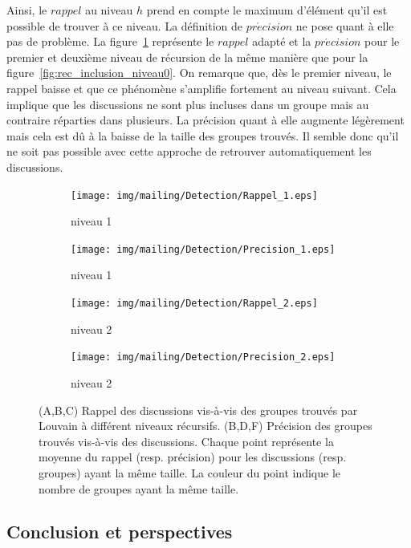 Ainsi, le $rappel$ au niveau $h$ prend en compte le maximum d'élément qu'il est possible de trouver à ce niveau.
La définition de $pr\acute{e}cision$ ne pose quant à  elle pas de problème.
La figure~\ref{fig:rec_inclusion} représente le $rappel$ adapté et la $pr\acute{e}cision$ pour le premier et deuxième niveau de récursion de la même manière que pour la figure~\ref{fig:rec_inclusion_niveau0}.
On remarque que, dès le premier niveau, le rappel baisse et que ce phénomène s'amplifie fortement au niveau suivant.
Cela implique que les discussions ne sont plus incluses dans un groupe mais au contraire réparties dans plusieurs.
La précision quant à elle augmente légèrement mais cela est dû à la baisse de la taille des groupes trouvés.
Il semble donc qu'il ne soit pas possible avec cette approche de retrouver automatiquement les discussions.


\begin{figure}
\centering
	\hfill
	\begin{subfigure}{0.4\textwidth}
		\texttt{[image: img/mailing/Detection/Rappel\_1.eps]}
		\caption{niveau 1}		
	\end{subfigure}
	\begin{subfigure}{0.4\textwidth}
		\texttt{[image: img/mailing/Detection/Precision\_1.eps]}
		\caption{niveau 1}		
	\end{subfigure}\hfill
	
	\hfill
	\begin{subfigure}{0.4\textwidth}
		\texttt{[image: img/mailing/Detection/Rappel\_2.eps]}
		\caption{niveau 2}		
	\end{subfigure}
	\begin{subfigure}{0.4\textwidth}
		\texttt{[image: img/mailing/Detection/Precision\_2.eps]}
		\caption{niveau 2}		
	\end{subfigure}\hfill

\caption{(A,B,C) Rappel des discussions vis-à-vis des groupes trouvés par Louvain à différent niveaux récursifs.
(B,D,F) Précision des groupes trouvés vis-à-vis des discussions.
Chaque point représente la moyenne du rappel (resp. précision) pour les discussions (resp. groupes) ayant la même taille.
La couleur du point indique le nombre de groupes ayant la même taille.
}
\label{fig:rec_inclusion}
\end{figure}

\subsection{Conclusion et perspectives}

